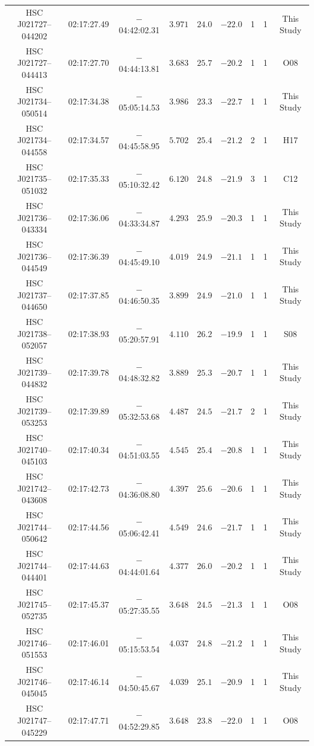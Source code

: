\documentclass[]{pasj01}
\begin{document}
{\begin{longtable}{ccccccccc}
HSC J021727--044202 & 02:17:27.49 & $-$04:42:02.31 & $3.971$ & $24.0$ & $-22.0$ & 1 & 1 & This Study \\
HSC J021727--044413 & 02:17:27.70 & $-$04:44:13.81 & $3.683$ & $25.7$ & $-20.2$ & 1 & 1 & O08 \\
HSC J021734--050514 & 02:17:34.38 & $-$05:05:14.53 & $3.986$ & $23.3$ & $-22.7$ & 1 & 1 & This Study \\
HSC J021734--044558 & 02:17:34.57 & $-$04:45:58.95 & $5.702$ & $25.4$ & $-21.2$ & 2 & 1 & H17 \\
HSC J021735--051032 & 02:17:35.33 & $-$05:10:32.42 & $6.120$ & $24.8$ & $-21.9$ & 3 & 1 & C12 \\
HSC J021736--043334 & 02:17:36.06 & $-$04:33:34.87 & $4.293$ & $25.9$ & $-20.3$ & 1 & 1 & This Study \\
HSC J021736--044549 & 02:17:36.39 & $-$04:45:49.10 & $4.019$ & $24.9$ & $-21.1$ & 1 & 1 & This Study \\
HSC J021737--044650 & 02:17:37.85 & $-$04:46:50.35 & $3.899$ & $24.9$ & $-21.0$ & 1 & 1 & This Study \\
HSC J021738--052057 & 02:17:38.93 & $-$05:20:57.91 & $4.110$ & $26.2$ & $-19.9$ & 1 & 1 & S08 \\
HSC J021739--044832 & 02:17:39.78 & $-$04:48:32.82 & $3.889$ & $25.3$ & $-20.7$ & 1 & 1 & This Study \\
HSC J021739--053253 & 02:17:39.89 & $-$05:32:53.68 & $4.487$ & $24.5$ & $-21.7$ & 2 & 1 & This Study \\
HSC J021740--045103 & 02:17:40.34 & $-$04:51:03.55 & $4.545$ & $25.4$ & $-20.8$ & 1 & 1 & This Study \\
HSC J021742--043608 & 02:17:42.73 & $-$04:36:08.80 & $4.397$ & $25.6$ & $-20.6$ & 1 & 1 & This Study \\
HSC J021744--050642 & 02:17:44.56 & $-$05:06:42.41 & $4.549$ & $24.6$ & $-21.7$ & 1 & 1 & This Study \\
HSC J021744--044401 & 02:17:44.63 & $-$04:44:01.64 & $4.377$ & $26.0$ & $-20.2$ & 1 & 1 & This Study \\
HSC J021745--052735 & 02:17:45.37 & $-$05:27:35.55 & $3.648$ & $24.5$ & $-21.3$ & 1 & 1 & O08 \\
HSC J021746--051553 & 02:17:46.01 & $-$05:15:53.54 & $4.037$ & $24.8$ & $-21.2$ & 1 & 1 & This Study \\
HSC J021746--045045 & 02:17:46.14 & $-$04:50:45.67 & $4.039$ & $25.1$ & $-20.9$ & 1 & 1 & This Study \\
HSC J021747--045229 & 02:17:47.71 & $-$04:52:29.85 & $3.648$ & $23.8$ & $-22.0$ & 1 & 1 & O08 \\

\end{longtable}}
\end{document}
